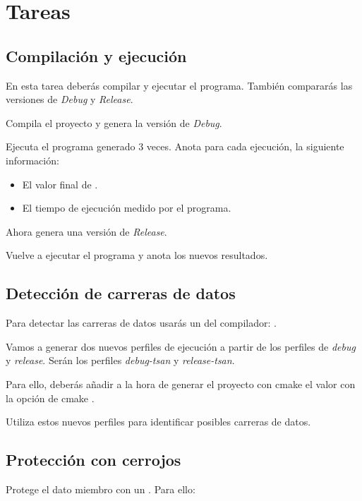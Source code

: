 \section{Tareas}

\subsection{Compilación y ejecución}

En esta tarea deberás compilar y ejecutar el programa. 
También compararás las versiones de \emph{Debug} y \emph{Release}.

Compila el proyecto y genera la versión de \emph{Debug}.

Ejecuta el programa generado 3 veces. Anota para cada ejecución, la siguiente información:
\begin{itemize}
\item El valor final de .
\item El tiempo de ejecución medido por el programa.
\end{itemize}

Ahora genera una versión de \emph{Release}.

Vuelve a ejecutar el programa y anota los nuevos resultados.

\subsection{Detección de carreras de datos}

Para detectar las carreras de datos usarás un  del compilador: 
.

Vamos a generar dos nuevos perfiles de ejecución a partir de los perfiles de 
\emph{debug} y \emph{release}. Serán los perfiles \emph{debug-tsan} y \emph{release-tsan}.

Para ello, deberás añadir a la hora de generar el proyecto con cmake el valor
 con la opción de cmake .

Utiliza estos nuevos perfiles para identificar posibles carreras de datos.

\subsection{Protección con cerrojos}

Protege el dato miembro  con un . Para ello:

